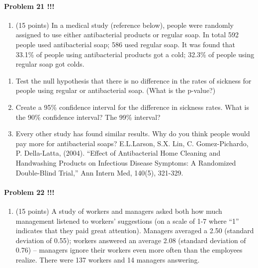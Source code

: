\documentclass[]{article}
\providecommand{\tightlist}{%
  \setlength{\itemsep}{0pt}\setlength{\parskip}{0pt}}
\let\oldparagraph\paragraph
\renewcommand{\paragraph}[1]{\oldparagraph{#1}\mbox{}}
\begin{document}
\paragraph{Problem 21 !!!}\label{problem-21}

\begin{enumerate}
\def\labelenumi{\arabic{enumi}.}
\setcounter{enumi}{25}
\tightlist
\item
  (15 points) In a medical study (reference below), people were randomly
  assigned to use either antibacterial products or regular soap. In
  total 592 people used antibacterial soap; 586 used regular soap. It
  was found that 33.1\% of people using antibacterial products got a
  cold; 32.3\% of people using regular soap got colds.
\end{enumerate}

\begin{enumerate}
\def\labelenumi{\alph{enumi}.}
\setcounter{enumi}{3}
\tightlist
\item
  Test the null hypothesis that there is no difference in the rates of
  sickness for people using regular or antibacterial soap. (What is the
  p-value?)
\item
  Create a 95\% confidence interval for the difference in sickness
  rates. What is the 90\% confidence interval? The 99\% interval?
\item
  Every other study has found similar results. Why do you think people
  would pay more for antibacterial soaps? E.L.Larson, S.X. Lin, C.
  Gomez-Pichardo, P. Della-Latta, (2004). ``Effect of Antibacterial Home
  Cleaning and Handwashing Products on Infectious Disease Symptoms: A
  Randomized Double-Blind Trial,'' Ann Intern Med, 140(5), 321-329.
\end{enumerate}

\paragraph{Problem 22 !!!}\label{problem-22}

\begin{enumerate}
\def\labelenumi{\arabic{enumi}.}
\setcounter{enumi}{26}
\tightlist
\item
  (15 points) A study of workers and managers asked both how much
  management listened to workers' suggestions (on a scale of 1-7 where
  ``1'' indicates that they paid great attention). Managers averaged a
  2.50 (standard deviation of 0.55); workers answered an average 2.08
  (standard deviation of 0.76) -- managers ignore their workers even
  more often than the employees realize. There were 137 workers and 14
  managers answering.
\end{enumerate}
\end{document}

